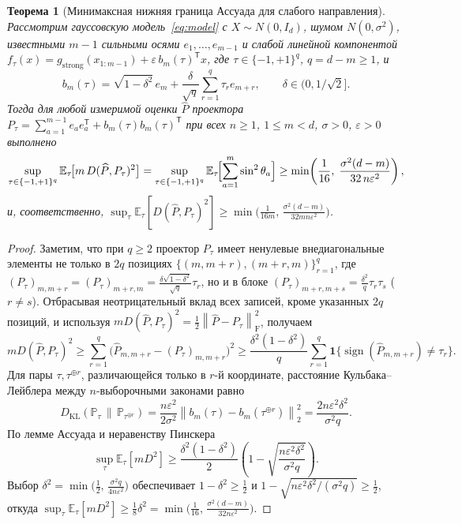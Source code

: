 \documentclass[11pt,a4paper]{article}
\numberwithin{equation}{section}
\newtheorem{theorem}{Теорема}[section]
\theoremstyle{definition}
\theoremstyle{remark}
\newcommand{\E}{\mathbb{E}}
\newcommand{\T}{^{\mathsf T}}
\newcommand{\F}{_{\mathrm{F}}}
\newcommand{\norm}[1]{\left\lVert #1 \right\rVert}
\begin{document}
\begin{theorem}[Минимаксная нижняя граница Ассуада для слабого направления]
\label{thm:assouad}
Рассмотрим гауссовскую модель~\eqref{eq:model} с $X \sim N(0, I_d)$, шумом $N(0, \sigma^2)$,
известными $m-1$ сильными осями $e_1, \dots, e_{m-1}$ и слабой линейной компонентой
$f_\tau(x) = g_{\mathrm{strong}}(x_{1:m-1}) + \varepsilon\, b_m(\tau)\T x$,
где $\tau \in \{-1, +1\}^q$, $q = d - m \ge 1$, и
\[
  b_m(\tau) = \sqrt{1 - \delta^2}\, e_m + \frac{\delta}{\sqrt{q}} \sum_{r=1}^q \tau_r e_{m+r},
  \qquad \delta \in (0, 1/\sqrt{2}].
\]
Тогда для любой измеримой оценки $\widehat{P}$ проектора $P_\tau = \sum_{a=1}^{m-1} e_a e_a\T + b_m(\tau) b_m(\tau)\T$
при всех $n \ge 1$, $1 \le m < d$, $\sigma > 0$, $\varepsilon > 0$ выполнено
\begin{equation}\label{eq:assouad}
  \sup_{\tau \in \{-1,+1\}^q} \E_\tau\!\bigl[m\, D(\widehat{P}, P_\tau)^2\bigr]
  = \sup_{\tau \in \{-1,+1\}^q} \E_\tau\!\Bigl[\sum_{a=1}^m \sin^2 \theta_a\Bigr]
  \ge \min\!\left(\frac{1}{16},\; \frac{\sigma^2 (d - m)}{32\, n \varepsilon^2}\right),
\end{equation}
и, соответственно, $\sup_\tau \E_\tau[D(\widehat{P}, P_\tau)^2] \ge \min\!\bigl(\frac{1}{16m},\, \frac{\sigma^2(d-m)}{32 m n \varepsilon^2}\bigr)$.
\end{theorem}

\begin{proof}
Заметим, что при $q \ge 2$ проектор $P_\tau$ имеет ненулевые внедиагональные элементы не только
в $2q$ позициях $\{(m, m+r), (m+r, m)\}_{r=1}^q$, где $(P_\tau)_{m,m+r} = (P_\tau)_{m+r,m} = \frac{\delta\sqrt{1-\delta^2}}{\sqrt{q}}\tau_r$,
но и в блоке $(P_\tau)_{m+r, m+s} = \frac{\delta^2}{q}\tau_r \tau_s$ ($r \ne s$).
Отбрасывая неотрицательный вклад всех записей, кроме указанных $2q$ позиций,
и используя $m D(\widehat{P}, P_\tau)^2 = \frac{1}{2}\norm{\widehat{P} - P_\tau}\F^2$, получаем
\[
  m D(\widehat{P}, P_\tau)^2
  \ge \sum_{r=1}^q \bigl(\widehat{P}_{m, m+r} - (P_\tau)_{m, m+r}\bigr)^2
  \ge \frac{\delta^2 (1 - \delta^2)}{q} \sum_{r=1}^q \mathbf{1}\{\operatorname{sign}(\widehat{P}_{m, m+r}) \ne \tau_r\}.
\]
Для пары $\tau, \tau^{\oplus r}$, различающейся только в $r$-й координате,
расстояние Кульбака--Лейблера между $n$-выборочными законами равно
\[
  D_{\mathrm{KL}}(\mathbb{P}_\tau \,\|\, \mathbb{P}_{\tau^{\oplus r}})
  = \frac{n \varepsilon^2}{2 \sigma^2} \norm{b_m(\tau) - b_m(\tau^{\oplus r})}_2^2
  = \frac{2 n \varepsilon^2 \delta^2}{\sigma^2 q}.
\]
По лемме Ассуада и неравенству Пинскера
\[
  \sup_\tau \E_\tau[m D^2]
  \ge \frac{\delta^2(1-\delta^2)}{2}\left(1 - \sqrt{\frac{n\varepsilon^2\delta^2}{\sigma^2 q}}\right).
\]
Выбор $\delta^2 = \min\!\bigl(\frac{1}{2},\, \frac{\sigma^2 q}{4 n \varepsilon^2}\bigr)$
обеспечивает $1 - \delta^2 \ge \frac{1}{2}$ и $1 - \sqrt{n\varepsilon^2\delta^2 / (\sigma^2 q)} \ge \frac{1}{2}$,
откуда $\sup_\tau \E_\tau[m D^2] \ge \frac{1}{8}\delta^2 = \min\!\bigl(\frac{1}{16},\, \frac{\sigma^2(d-m)}{32 n \varepsilon^2}\bigr)$.
\end{proof}
\end{document}
